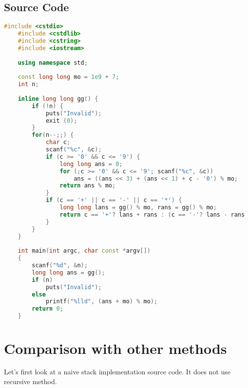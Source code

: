 \documentclass{report}
\begin{document}
\subsection{Source Code}

\begin{lstlisting}[language=C++, caption={Problem 2 c++ source code}]
    #include <cstdio>
    #include <cstdlib>
    #include <cstring>
    #include <iostream>
    
    using namespace std;
    
    const long long mo = 1e9 + 7;
    int n;
    
    inline long long gg() {
        if (!n) {
            puts("Invalid");
            exit (0);
        }
        for(n--;;) {
            char c;
            scanf("%c", &c);
            if (c >= '0' && c <= '9') {
                long long ans = 0;
                for (;c >= '0' && c <= '9'; scanf("%c", &c))
                    ans = ((ans << 3) + (ans << 1) + c - '0') % mo;
                return ans % mo;
            }
            if (c == '+' || c == '-' || c == '*') {
                long long lans = gg() % mo, rans = gg() % mo;
                return c == '+'? lans + rans : (c == '-'? lans - rans : lans * rans);
            }
        }
    }
    
    int main(int argc, char const *argv[])
    {
        scanf("%d", &n);
        long long ans = gg();
        if (n)
            puts("Invalid");
        else
            printf("%lld", (ans + mo) % mo);
        return 0;
    }    
\end{lstlisting}

\section{Comparison with other methods}

Let's first look at a naive stack implementation source code.
It does not use recursive method.
\end{document}
